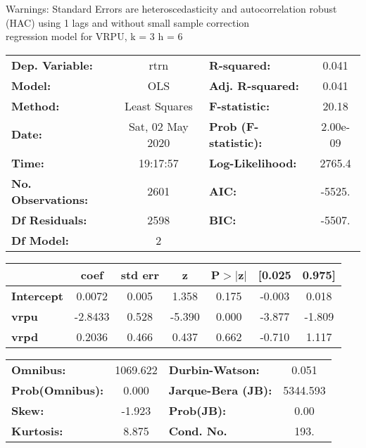 Warnings: \newline
 [1] Standard Errors are heteroscedasticity and autocorrelation robust (HAC) using 1 lags and without small sample correction\\ 

regression model for VRPU, k = 3 h = 6\begin{center}
\begin{tabular}{lclc}
\toprule
\textbf{Dep. Variable:}    &       rtrn       & \textbf{  R-squared:         } &     0.041   \\
\textbf{Model:}            &       OLS        & \textbf{  Adj. R-squared:    } &     0.041   \\
\textbf{Method:}           &  Least Squares   & \textbf{  F-statistic:       } &     20.18   \\
\textbf{Date:}             & Sat, 02 May 2020 & \textbf{  Prob (F-statistic):} &  2.00e-09   \\
\textbf{Time:}             &     19:17:57     & \textbf{  Log-Likelihood:    } &    2765.4   \\
\textbf{No. Observations:} &        2601      & \textbf{  AIC:               } &    -5525.   \\
\textbf{Df Residuals:}     &        2598      & \textbf{  BIC:               } &    -5507.   \\
\textbf{Df Model:}         &           2      & \textbf{                     } &             \\
\bottomrule
\end{tabular}
\begin{tabular}{lcccccc}
                   & \textbf{coef} & \textbf{std err} & \textbf{z} & \textbf{P$> |$z$|$} & \textbf{[0.025} & \textbf{0.975]}  \\
\midrule
\textbf{Intercept} &       0.0072  &        0.005     &     1.358  &         0.175        &       -0.003    &        0.018     \\
\textbf{vrpu}      &      -2.8433  &        0.528     &    -5.390  &         0.000        &       -3.877    &       -1.809     \\
\textbf{vrpd}      &       0.2036  &        0.466     &     0.437  &         0.662        &       -0.710    &        1.117     \\
\bottomrule
\end{tabular}
\begin{tabular}{lclc}
\textbf{Omnibus:}       & 1069.622 & \textbf{  Durbin-Watson:     } &    0.051  \\
\textbf{Prob(Omnibus):} &   0.000  & \textbf{  Jarque-Bera (JB):  } & 5344.593  \\
\textbf{Skew:}          &  -1.923  & \textbf{  Prob(JB):          } &     0.00  \\
\textbf{Kurtosis:}      &   8.875  & \textbf{  Cond. No.          } &     193.  \\
\bottomrule
\end{tabular}
\end{center}

